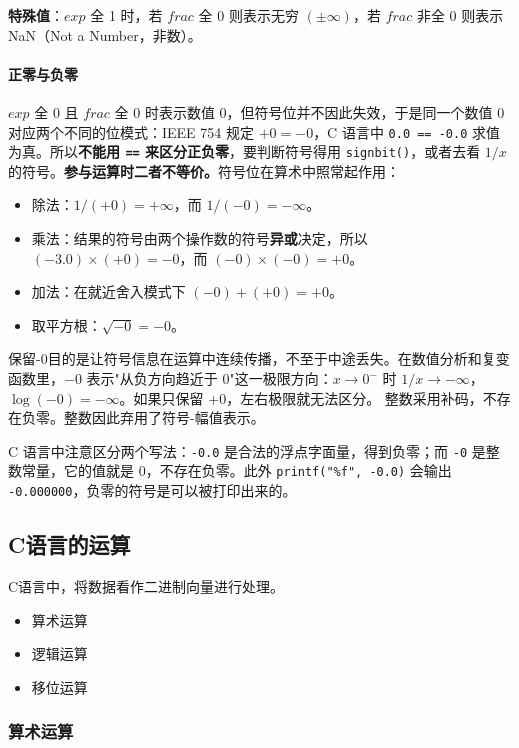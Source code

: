 \textbf{特殊值}：$exp$ 全 1 时，若 $frac$ 全 0 则表示无穷 $(\pm\infty)$，若 $frac$ 非全 0 则表示 NaN（Not a Number，非数）。

\paragraph{正零与负零}

$exp$ 全 0 且 $frac$ 全 0 时表示数值 0，但符号位并不因此失效，于是同一个数值 0 对应两个不同的位模式：IEEE 754 规定 $+0 = -0$，C 语言中 \texttt{0.0 == -0.0} 求值为真。所以\textbf{不能用 \texttt{==} 来区分正负零}，要判断符号得用 \texttt{signbit()}，或者去看 $1/x$ 的符号。\textbf{参与运算时二者不等价。}符号位在算术中照常起作用：

\begin{itemize}
    \item 除法：$1/(+0) = +\infty$，而 $1/(-0) = -\infty$。
    \item 乘法：结果的符号由两个操作数的符号\textbf{异或}决定，所以 $(-3.0) \times (+0) = -0$，而 $(-0) \times (-0) = +0$。
    \item 加法：在就近舍入模式下 $(-0) + (+0) = +0$。
    \item 取平方根：$\sqrt{-0} = -0$。
\end{itemize}

保留-0目的是让符号信息在运算中连续传播，不至于中途丢失。在数值分析和复变函数里，$-0$ 表示"从负方向趋近于 0"这一极限方向：$x \to 0^-$ 时 $1/x \to -\infty$，$\log(-0) = -\infty$。如果只保留 $+0$，左右极限就无法区分。
整数采用补码，不存在负零。整数因此弃用了符号-幅值表示。

C 语言中注意区分两个写法：\texttt{-0.0} 是合法的浮点字面量，得到负零；而 \texttt{-0} 是整数常量，它的值就是 0，不存在负零。此外 \texttt{printf("\%f", -0.0)} 会输出 \texttt{-0.000000}，负零的符号是可以被打印出来的。
\subsection{C语言的运算}

C语言中，将数据看作二进制向量进行处理。

\begin{itemize}
    \item 算术运算
    \item 逻辑运算
    \item 移位运算
\end{itemize}

\subsubsection{算术运算}

